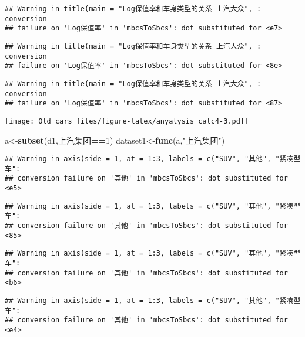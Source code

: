 \documentclass[]{article}
\newenvironment{Shaded}{\begin{snugshade}}{\end{snugshade}}
\newcommand{\KeywordTok}[1]{\textcolor[rgb]{0.13,0.29,0.53}{\textbf{#1}}}
\newcommand{\DecValTok}[1]{\textcolor[rgb]{0.00,0.00,0.81}{#1}}
\newcommand{\StringTok}[1]{\textcolor[rgb]{0.31,0.60,0.02}{#1}}
\newcommand{\OperatorTok}[1]{\textcolor[rgb]{0.81,0.36,0.00}{\textbf{#1}}}
\newcommand{\NormalTok}[1]{#1}
\begin{document}
\begin{verbatim}
## Warning in title(main = "Log保值率和车身类型的关系 上汽大众", : conversion
## failure on 'Log保值率' in 'mbcsToSbcs': dot substituted for <e7>
\end{verbatim}

\begin{verbatim}
## Warning in title(main = "Log保值率和车身类型的关系 上汽大众", : conversion
## failure on 'Log保值率' in 'mbcsToSbcs': dot substituted for <8e>
\end{verbatim}

\begin{verbatim}
## Warning in title(main = "Log保值率和车身类型的关系 上汽大众", : conversion
## failure on 'Log保值率' in 'mbcsToSbcs': dot substituted for <87>
\end{verbatim}

\texttt{[image: Old\_cars\_files/figure-latex/anyalysis calc4-3.pdf]}

\begin{Shaded}
\begin{Highlighting}[]
\NormalTok{a<-}\KeywordTok{subset}\NormalTok{(d1,上汽集团}\OperatorTok{==}\DecValTok{1}\NormalTok{)}
\NormalTok{dataset1<-}\KeywordTok{func}\NormalTok{(a,}\StringTok{"上汽集团"}\NormalTok{)}
\end{Highlighting}
\end{Shaded}

\begin{verbatim}
## Warning in axis(side = 1, at = 1:3, labels = c("SUV", "其他", "紧凑型车":
## conversion failure on '其他' in 'mbcsToSbcs': dot substituted for <e5>
\end{verbatim}

\begin{verbatim}
## Warning in axis(side = 1, at = 1:3, labels = c("SUV", "其他", "紧凑型车":
## conversion failure on '其他' in 'mbcsToSbcs': dot substituted for <85>
\end{verbatim}

\begin{verbatim}
## Warning in axis(side = 1, at = 1:3, labels = c("SUV", "其他", "紧凑型车":
## conversion failure on '其他' in 'mbcsToSbcs': dot substituted for <b6>
\end{verbatim}

\begin{verbatim}
## Warning in axis(side = 1, at = 1:3, labels = c("SUV", "其他", "紧凑型车":
## conversion failure on '其他' in 'mbcsToSbcs': dot substituted for <e4>
\end{verbatim}
\end{document}
